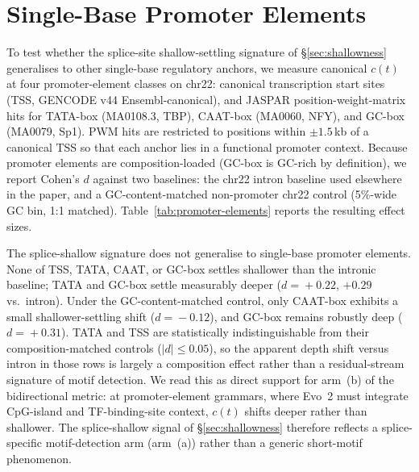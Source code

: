 \documentclass{article}
\theoremstyle{plain}
\theoremstyle{definition}
\theoremstyle{remark}
\begin{document}
\section{Single-Base Promoter Elements}
\label{app:promoter-elements}

To test whether the splice-site shallow-settling signature of
\S\ref{sec:shallowness} generalises to other single-base regulatory
anchors, we measure canonical $c(t)$ at four promoter-element classes
on chr22: canonical transcription start sites (TSS, GENCODE v44
Ensembl-canonical), and JASPAR position-weight-matrix hits for TATA-box
(MA0108.3, TBP), CAAT-box (MA0060, NFY), and GC-box (MA0079, Sp1). PWM
hits are restricted to positions within $\pm 1.5$\,kb of a canonical
TSS so that each anchor lies in a functional promoter context. Because
promoter elements are composition-loaded (GC-box is GC-rich by
definition), we report Cohen's $d$ against two baselines: the chr22
intron baseline used elsewhere in the paper, and a GC-content-matched
non-promoter chr22 control (5\%-wide GC bin, 1:1 matched).
Table~\ref{tab:promoter-elements} reports the resulting effect sizes.

The splice-shallow signature does not generalise to single-base
promoter elements. None of TSS, TATA, CAAT, or GC-box settles shallower
than the intronic baseline; TATA and GC-box settle measurably deeper
($d\!=\!+0.22$, $+0.29$ vs.\ intron). Under the GC-content-matched
control, only CAAT-box exhibits a small shallower-settling shift
($d\!=\!-0.12$), and GC-box remains robustly deep ($d\!=\!+0.31$). TATA
and TSS are statistically indistinguishable from their
composition-matched controls ($|d|\!\le\!0.05$), so the apparent depth
shift versus intron in those rows is largely a composition effect
rather than a residual-stream signature of motif detection. We read
this as direct support for arm~(b) of the bidirectional metric: at
promoter-element grammars, where Evo~2 must integrate CpG-island and
TF-binding-site context, $c(t)$ shifts deeper rather than shallower.
The splice-shallow signal of \S\ref{sec:shallowness} therefore reflects
a splice-specific motif-detection arm (arm~(a)) rather than a generic
short-motif phenomenon.
\end{document}
